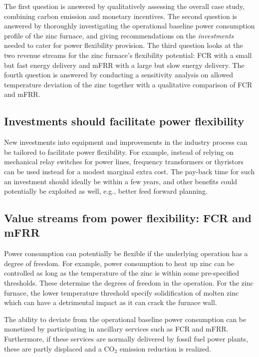 \documentclass[sigconf]{acmart}
\begin{document}
The first question is answered by qualitatively assessing the overall case study, combining carbon emission and monetary incentives. The second question is answered by thoroughly investigating the operational baseline power consumption profile of the zinc furnace, and giving recommendations on the \textit{investments} needed to cater for power flexibility provision. The third question looks at the two revenue streams for the zinc furnace's flexibility potential: FCR with a small but fast energy delivery and mFRR with a large but slow energy delivery. The fourth question is answered by conducting a sensitivity analysis on allowed temperature deviation of the zinc together with a qualitative comparison of FCR and mFRR.


\subsection{Investments should facilitate power flexibility}

New investments into equipment and improvements in the industry process can be tailored to facilitate power flexibility. For example, instead of relying on mechanical relay switches for power lines, frequency transformers or thyristors can be used instead for a modest marginal extra cost. The pay-back time for such an investment should ideally be within a few years, and other benefits could potentially be exploited as well, e.g., better feed forward planning.


\subsection{Value streams from power flexibility: FCR and mFRR}

Power consumption can potentially be flexible if the underlying operation has a  degree of freedom. For example, power consumption to heat up zinc can be controlled as long as the temperature of the zinc is within some pre-specified thresholds. These determine the degrees of freedom in the operation. For the zinc furnace, the lower temperature threshold specify solidification of molten zinc which can have a detrimental impact as it can crack the furnace wall.

The ability to deviate from the operational baseline power consumption can be monetized by participating in ancillary services such as FCR and mFRR. Furthermore, if these services are normally delivered by fossil fuel power plants, these are partly displaced and a CO$_{2}$ emission reduction is realized.
\end{document}
